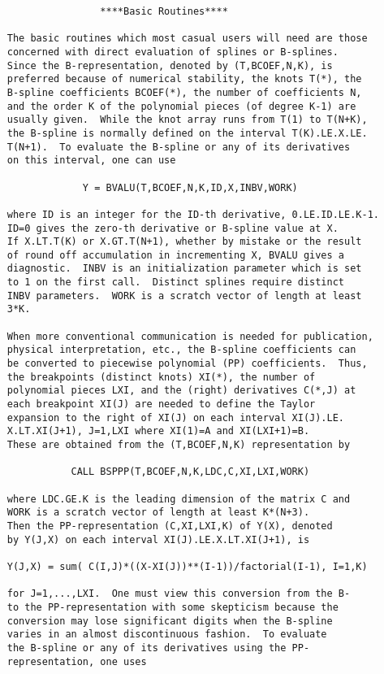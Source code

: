 \begin{verbatim}
                     ****Basic Routines****

     The basic routines which most casual users will need are those
     concerned with direct evaluation of splines or B-splines.
     Since the B-representation, denoted by (T,BCOEF,N,K), is
     preferred because of numerical stability, the knots T(*), the
     B-spline coefficients BCOEF(*), the number of coefficients N,
     and the order K of the polynomial pieces (of degree K-1) are
     usually given.  While the knot array runs from T(1) to T(N+K),
     the B-spline is normally defined on the interval T(K).LE.X.LE.
     T(N+1).  To evaluate the B-spline or any of its derivatives
     on this interval, one can use

                  Y = BVALU(T,BCOEF,N,K,ID,X,INBV,WORK)

     where ID is an integer for the ID-th derivative, 0.LE.ID.LE.K-1.
     ID=0 gives the zero-th derivative or B-spline value at X.
     If X.LT.T(K) or X.GT.T(N+1), whether by mistake or the result
     of round off accumulation in incrementing X, BVALU gives a
     diagnostic.  INBV is an initialization parameter which is set
     to 1 on the first call.  Distinct splines require distinct
     INBV parameters.  WORK is a scratch vector of length at least
     3*K.

     When more conventional communication is needed for publication,
     physical interpretation, etc., the B-spline coefficients can
     be converted to piecewise polynomial (PP) coefficients.  Thus,
     the breakpoints (distinct knots) XI(*), the number of
     polynomial pieces LXI, and the (right) derivatives C(*,J) at
     each breakpoint XI(J) are needed to define the Taylor
     expansion to the right of XI(J) on each interval XI(J).LE.
     X.LT.XI(J+1), J=1,LXI where XI(1)=A and XI(LXI+1)=B.
     These are obtained from the (T,BCOEF,N,K) representation by

                CALL BSPPP(T,BCOEF,N,K,LDC,C,XI,LXI,WORK)

     where LDC.GE.K is the leading dimension of the matrix C and
     WORK is a scratch vector of length at least K*(N+3).
     Then the PP-representation (C,XI,LXI,K) of Y(X), denoted
     by Y(J,X) on each interval XI(J).LE.X.LT.XI(J+1), is

     Y(J,X) = sum( C(I,J)*((X-XI(J))**(I-1))/factorial(I-1), I=1,K)

     for J=1,...,LXI.  One must view this conversion from the B-
     to the PP-representation with some skepticism because the
     conversion may lose significant digits when the B-spline
     varies in an almost discontinuous fashion.  To evaluate
     the B-spline or any of its derivatives using the PP-
     representation, one uses


\end{verbatim}
